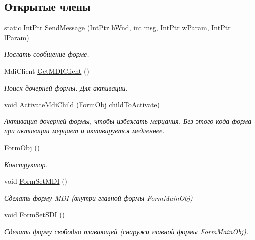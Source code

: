 \subsection*{Открытые члены}
\begin{DoxyCompactItemize}
\item 
static Int\+Ptr \mbox{\hyperlink{class_f_b_a_1_1_form_obj_a82e48ef73bab19e87beabc74d5065b39}{Send\+Message}} (Int\+Ptr h\+Wnd, int msg, Int\+Ptr w\+Param, Int\+Ptr l\+Param)
\begin{DoxyCompactList}\small\item\em Послать сообщение форме. \end{DoxyCompactList}\item 
Mdi\+Client \mbox{\hyperlink{class_f_b_a_1_1_form_obj_a922fdb209cda85aba595c2c5d53a1e1a}{Get\+M\+D\+I\+Client}} ()
\begin{DoxyCompactList}\small\item\em Поиск дочерней формы. Для активации. \end{DoxyCompactList}\item 
void \mbox{\hyperlink{class_f_b_a_1_1_form_obj_a67855cc1f5ca5fda0fa9564a3de101cc}{Activate\+Mdi\+Child}} (\mbox{\hyperlink{class_f_b_a_1_1_form_obj}{Form\+Obj}} child\+To\+Activate)
\begin{DoxyCompactList}\small\item\em Активация дочерней формы, чтобы избежать мерцания. Без этого кода форма при активации мерцает и активируется медленнее. \end{DoxyCompactList}\item 
\mbox{\hyperlink{class_f_b_a_1_1_form_obj_a9331b48eb6bce47e5e328a8ee6744a1c}{Form\+Obj}} ()
\begin{DoxyCompactList}\small\item\em Конструктор. \end{DoxyCompactList}\item 
void \mbox{\hyperlink{class_f_b_a_1_1_form_obj_a3e74ea199f5a4e12b79efd06135e3118}{Form\+Set\+M\+DI}} ()
\begin{DoxyCompactList}\small\item\em Сделать форму M\+DI (внутри главной формы Form\+Main\+Obj) \end{DoxyCompactList}\item 
void \mbox{\hyperlink{class_f_b_a_1_1_form_obj_a2c0349e279cc5fffde623381db8eb064}{Form\+Set\+S\+DI}} ()
\begin{DoxyCompactList}\small\item\em Сделать форму свободно плавающей (снаружи главной формы Form\+Main\+Obj). \end{DoxyCompactList}\item 

\end{DoxyCompactItemize}
